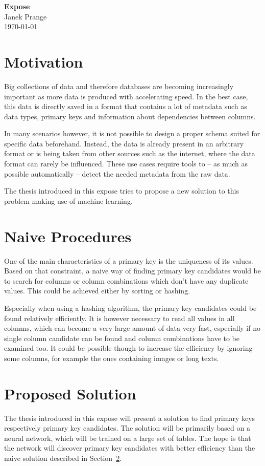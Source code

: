 \documentclass[a4paper]{article}
\begin{document}
\thispagestyle{firstpagestyle}
\begin{center}
  \huge \textbf{Expose}\\[8pt]
  \normalsize Janek Prange\\
  \today
\end{center}

\section{Motivation}
Big collections of data and therefore databases are becoming increasingly important as more data is produced with accelerating speed. In the best case, this data is directly saved in a format that contains a lot of metadata such as data types, primary keys and information about dependencies between columns.

In many scenarios however, it is not possible to design a proper schema suited for specific data beforehand. Instead, the data is already present in an arbitrary format or is being taken from other sources such as the internet, where the data format can rarely be influenced. These use cases require tools to -- as much as possible automatically -- detect the needed metadata from the raw data. %

The thesis introduced in this expose tries to propose a new solution to this problem making use of machine learning.


\section{Naive Procedures}\label{sec:naiveProcedures}
One of the main characteristics of a primary key is the uniqueness of its values. Based on that constraint, a naive way of finding primary key candidates would be to search for columns or column combinations which don't have any duplicate values. This could be achieved either by sorting or hashing.

Especially when using a hashing algorithm, the primary key candidates could be found relatively efficiently. It is however necessary to read all values in all columns, which can become a very large amount of data very fast, especially if no single column candidate can be found and column combinations have to be examined too. It could be possible though to increase the efficiency by ignoring some columns, for example the ones containing images or long texts.


\section{Proposed Solution}\label{sec:proposedSolution}
The thesis introduced in this expose will present a solution to find primary keys respectively primary key candidates. The solution will be primarily based on a neural network, which will be trained on a large set of tables. The hope is that the network will discover primary key candidates with better efficiency than the naive solution described in Section~\ref{sec:naiveProcedures}.
\end{document}
